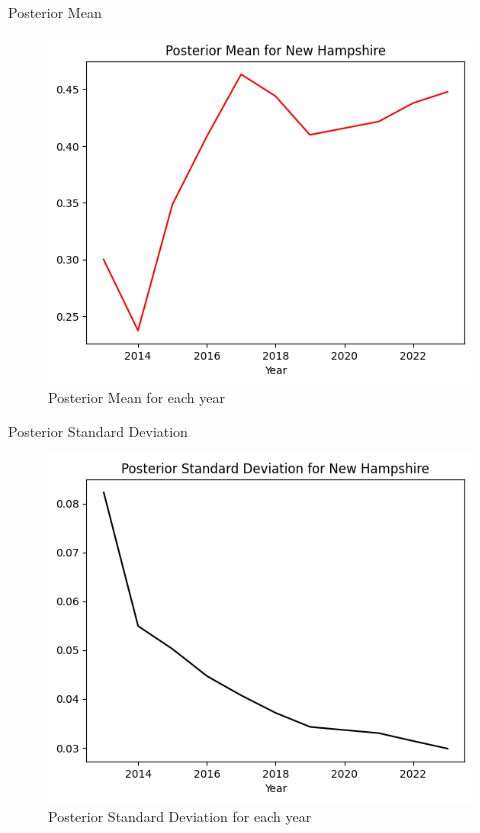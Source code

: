 \begin{frame}{Posterior Mean}
    
\begin{figure}
  \centering
  \includegraphics[width=.8\linewidth]{../Report/images/posterior-mean.png}
  \caption{Posterior Mean for each year}
\end{figure}

\end{frame}

\begin{frame}{Posterior Standard Deviation}

\begin{figure}
  \centering
  \includegraphics[width=.8\linewidth]{../Report/images/posterior-sd.png}
  \caption{Posterior Standard Deviation for each year}
\end{figure}

\end{frame}